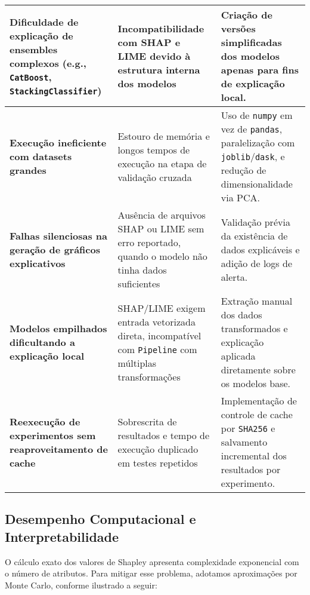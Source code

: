 \begin{table}[ht]
\begin{tabular}{|p{4.3cm}|p{4.6cm}|p{5.1cm}|}
\hline

\textbf{Dificuldade de explicação de ensembles complexos (e.g., \texttt{CatBoost}, \texttt{StackingClassifier})} &
Incompatibilidade com SHAP e LIME devido à estrutura interna dos modelos &
Criação de versões simplificadas dos modelos apenas para fins de explicação local. \\

\hline

\textbf{Execução ineficiente com datasets grandes} & 
Estouro de memória e longos tempos de execução na etapa de validação cruzada &
Uso de \texttt{numpy} em vez de \texttt{pandas}, paralelização com \texttt{joblib}/\texttt{dask}, e redução de dimensionalidade via PCA. \\

\hline

\textbf{Falhas silenciosas na geração de gráficos explicativos} &
Ausência de arquivos SHAP ou LIME sem erro reportado, quando o modelo não tinha dados suficientes &
Validação prévia da existência de dados explicáveis e adição de logs de alerta. \\

\hline

\textbf{Modelos empilhados dificultando a explicação local} &
SHAP/LIME exigem entrada vetorizada direta, incompatível com \texttt{Pipeline} com múltiplas transformações &
Extração manual dos dados transformados e explicação aplicada diretamente sobre os modelos base. \\

\hline

\textbf{Reexecução de experimentos sem reaproveitamento de cache} &
Sobrescrita de resultados e tempo de execução duplicado em testes repetidos &
Implementação de controle de cache por \texttt{SHA256} e salvamento incremental dos resultados por experimento. \\

\hline
\end{tabular}
\end{table}

\subsection*{Desempenho Computacional e Interpretabilidade}

O cálculo exato dos valores de Shapley apresenta complexidade exponencial com o número de atributos. Para mitigar esse problema, adotamos aproximações por Monte Carlo, conforme ilustrado a seguir:

